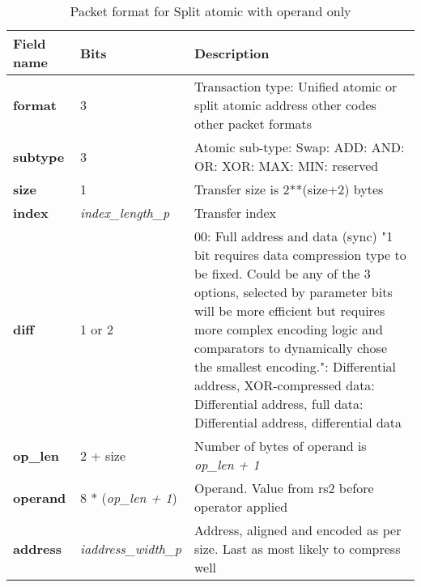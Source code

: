 \begin{table}[htp]
  \centering
  \caption{Packet format for Split atomic with operand only}
  \label{tab:te_datadx0y8}
  \begin{tabulary}{\textwidth}{|l|p{40mm}|p{90mm}|}
    \hline
    {\bf Field name} & {\bf Bits} & {\bf Description} \\
    \hline
    \textbf{format} & 	3	& Transaction type: Unified atomic or split atomic address\newline	
		other codes other packet formats\\
    \hline
    \textbf{subtype} & 	3	& Atomic sub-type: Swap: ADD: AND: OR: XOR: MAX: MIN: reserved\\	
    \hline
    \textbf{size} & 1 & Transfer size is 2**(size+2) bytes\\
    \hline
    \textbf{index} & \textit{index\_length\_p} & Transfer index\\
    \textbf{diff} & 1 or 2 & 00: Full address and data (sync)	"1 bit requires data compression type to be fixed.  Could be any of the 3 options, selected by parameter bits will be more efficient but requires more complex encoding logic and comparators to dynamically chose the smallest encoding.":  Differential address, XOR-compressed data: Differential address, full data: Differential address, differential data\\
    \hline
    \textbf{op\_len} & 2 + size &	Number of bytes of operand is \textit{op\_len + 1}\\
    \hline
    \textbf{operand}	& 8 * (\textit{op\_len + 1}) & Operand.  Value from rs2 before operator applied\\
    \hline
    \textbf{address} &  \textit {iaddress\_width\_p} &Address, aligned and encoded as per size. Last as most likely to compress well \\
    \hline
  \end{tabulary}
\end{table}

